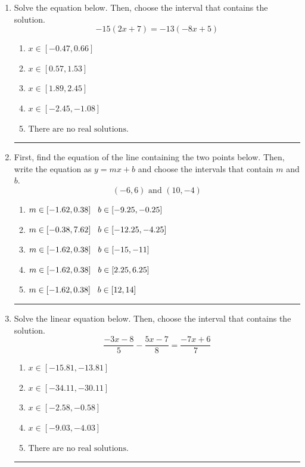 \documentclass[14pt]{extbook}
\newcommand{\litem}[1]{\item#1\hspace*{-1cm}\rule{\textwidth}{0.4pt}}
\begin{document}
\begin{enumerate}
\litem{
Solve the equation below. Then, choose the interval that contains the solution.\[ -15(2x + 7) = -13(-8x + 5) \]\begin{enumerate}[label=\Alph*.]
\item \( x \in [-0.47, 0.66] \)
\item \( x \in [0.57, 1.53] \)
\item \( x \in [1.89, 2.45] \)
\item \( x \in [-2.45, -1.08] \)
\item \( \text{There are no real solutions.} \)

\end{enumerate} }
\litem{
First, find the equation of the line containing the two points below. Then, write the equation as $ y=mx+b $ and choose the intervals that contain $m$ and $b$.\[ (-6, 6) \text{ and } (10, -4) \]\begin{enumerate}[label=\Alph*.]
\item \( m \in [-1.62, 0.38] \hspace*{3mm} b \in [-9.25, -0.25] \)
\item \( m \in [-0.38, 7.62] \hspace*{3mm} b \in [-12.25, -4.25] \)
\item \( m \in [-1.62, 0.38] \hspace*{3mm} b \in [-15, -11] \)
\item \( m \in [-1.62, 0.38] \hspace*{3mm} b \in [2.25, 6.25] \)
\item \( m \in [-1.62, 0.38] \hspace*{3mm} b \in [12, 14] \)

\end{enumerate} }
\litem{
Solve the linear equation below. Then, choose the interval that contains the solution.\[ \frac{-3x -8}{5} - \frac{5x -7}{8} = \frac{-7x + 6}{7} \]\begin{enumerate}[label=\Alph*.]
\item \( x \in [-15.81, -13.81] \)
\item \( x \in [-34.11, -30.11] \)
\item \( x \in [-2.58, -0.58] \)
\item \( x \in [-9.03, -4.03] \)
\item \( \text{There are no real solutions.} \)


\end{enumerate}}
\end{enumerate}
\end{document}
